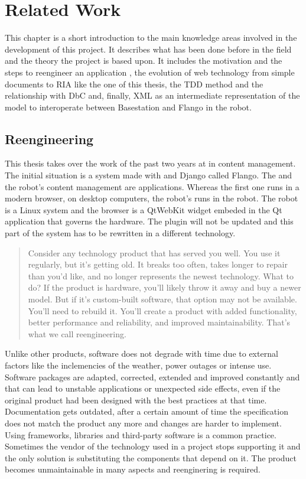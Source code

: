 \chapter{Related Work}
This chapter is a short introduction to the main knowledge areas involved in the development of this project.
It describes what has been done before in the field and the theory the project is based upon.
It includes the motivation and the steps to reengineer an application , the evolution of web technology from simple documents to \ac{RIA} like the one of this thesis, the \ac{TDD} method and the relationship with \ac{DbC} and, finally, \ac{XML} as an intermediate representation of the model to interoperate between Basestation and Flango \cm in the robot.

\section{Reengineering}
\label{sec:reengineering}
This thesis takes over the work of the past two years at \company in content management.
The initial situation is a system made with \flash and Django called Flango.
The \se and the robot's content management are \flash applications.
Whereas the first one runs in a modern browser, on desktop computers, the robot's \cm runs in the robot.
The robot is a Linux system and the browser is a QtWebKit widget embeded in the Qt application that governs the hardware.
The \flash plugin will not be updated and this part of the system has to be rewritten in a different technology.

\begin{quote} 
Consider any technology product that has served you well. 
You use it regularly, but it's getting old. 
It breaks too often, takes longer to repair than you'd like, and no longer represents the newest technology.
What to do? If the product is hardware, you'll likely throw it away and buy a newer model.
But if it's custom-built software, that option may not be available. 
You'll need to rebuild it. 
You'll create a product with added functionality, better performance and reliability, and improved maintainability.
That's what we call reengineering. \cite{Pressman:2007}
\end{quote}

Unlike other products, software does not degrade with time due to external factors like the inclemencies of the weather, power outages or intense use.
Software packages are adapted, corrected, extended and improved constantly and that can lead to unstable applications or unexpected side effects, even if the original product had been designed with the best practices at that time.
Documentation gets outdated, after a certain amount of time the specification does not match the product any more and changes are harder to implement. %
Using frameworks, libraries and third-party software is a common practice. 
Sometimes the vendor of the technology used in a project stops supporting it and the only solution is substituting the components that depend on it. 
The product becomes unmaintainable in many aspects and reenginering is required. 

